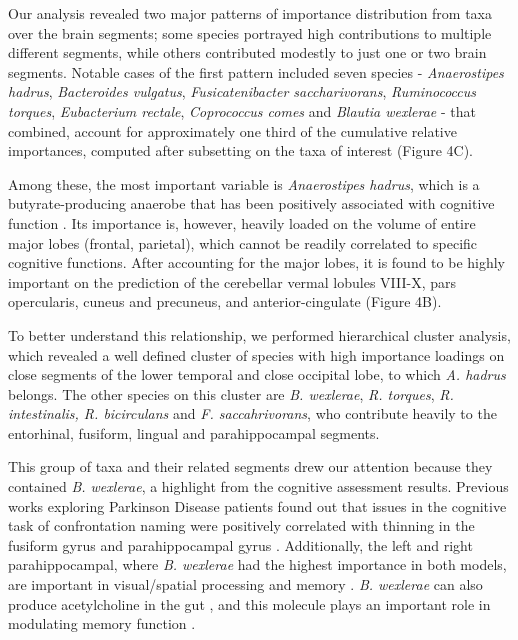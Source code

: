 \documentclass{article}
\begin{document}
Our analysis revealed two major patterns of importance distribution from
taxa over the brain segments; some species portrayed high contributions
to multiple different segments, while others contributed modestly to
just one or two brain segments. Notable cases of the first pattern
included seven species - \emph{Anaerostipes hadrus}, \emph{Bacteroides
vulgatus}, \emph{Fusicatenibacter saccharivorans}, \emph{Ruminococcus
torques}, \emph{Eubacterium rectale}, \emph{Coprococcus comes} and
\emph{Blautia wexlerae} - that combined, account for approximately one
third of the cumulative relative importances, computed after subsetting
on the taxa of interest (Figure 4C).

Among these, the most important variable is \emph{Anaerostipes hadrus},
which is a butyrate-producing anaerobe that has been positively
associated with cognitive function
\cite{kantGenomeSequenceButyrateProducing2015,liCorrelationsGutMicrobiota2022}.
Its importance is, however, heavily loaded on the volume
of entire major lobes (frontal, parietal), which cannot be readily
correlated to specific cognitive functions. After accounting for the
major lobes, it is found to be highly important on the prediction of the
cerebellar vermal lobules VIII-X, pars opercularis, cuneus and
precuneus, and anterior-cingulate (Figure 4B).

To better understand this relationship, we performed hierarchical
cluster analysis, which revealed a well defined cluster of species with
high importance loadings on close segments of the lower temporal and
close occipital lobe, to which \emph{A. hadrus} belongs. The other
species on this cluster are \emph{B. wexlerae}, \emph{R. torques},
\emph{R. intestinalis, R. bicirculans} and \emph{F. saccahrivorans}, who
contribute heavily to the entorhinal, fusiform, lingual and
parahippocampal segments.

This group of taxa and their related segments drew our attention because
they contained \emph{B. wexlerae}, a highlight from the cognitive
assessment results. Previous works exploring Parkinson Disease patients
found out that issues in the cognitive task of confrontation naming were
positively correlated with thinning in the fusiform gyrus and
parahippocampal gyrus
\cite{pagonabarragaPatternRegionalCortical2013}.
Additionally, the left and right parahippocampal, where \emph{B.
wexlerae} had the highest importance in both models, are important in
visual/spatial processing and memory
\cite{aminoffRoleParahippocampalCortex2013}.
\emph{B. wexlerae} can also produce acetylcholine in the gut
\cite{hosomiOralAdministrationBlautia2022},
and this molecule plays an important role in modulating memory
function
\cite{haamCholinergicModulationHippocampal2017}.
\end{document}
